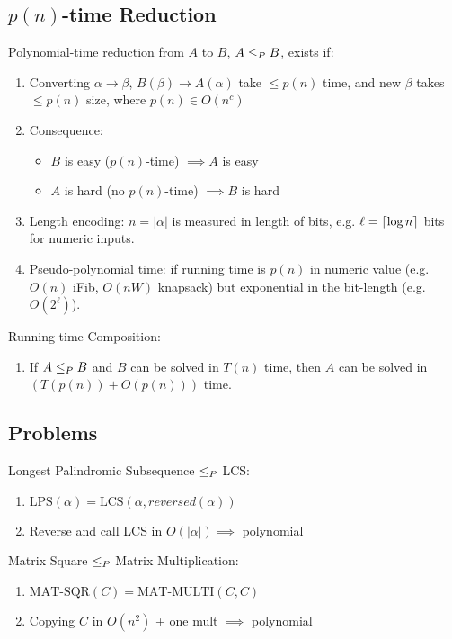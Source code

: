 \documentclass[12pt, a4paper]{article}
\begin{document}
\begin{multicols*}{3}
\subsection{$p(n)$-time Reduction}
Polynomial-time reduction from $A$ to $B$, $A \leq_{P} B$, exists if:
\begin{enumerate}[\roman*.]
  \item Converting $\alpha \rightarrow \beta$, $B(\beta) \rightarrow A(\alpha)$ take $\leq p(n)$ time, and new $\beta$ takes $\leq p(n)$ size, where $p(n) \in O(n^c)$
  \item Consequence:
    \begin{itemize}\vspace{2pt}
      \item $B$ is easy ($p(n)$-time) $\implies A$ is easy
      \item $A$ is hard (no $p(n)$-time) $\implies B$ is hard
    \end{itemize}
  \item Length encoding: $n=|\alpha|$ is measured in length of bits, e.g. $\ell = \lceil \log n \rceil$ bits for numeric inputs.  
  \item Pseudo-polynomial time: if running time is $p(n)$ in numeric value (e.g. $O(n)$ iFib, $O(nW)$ knapsack) but exponential in the bit-length (e.g. $O(2^\ell)$).  
\end{enumerate}

Running-time Composition:
\begin{enumerate}[\roman*.]
  \item If $A \leq_{P} B$ and $B$ can be solved in $T(n)$ time, then  
        $A$ can be solved in $\left(T(p(n)) + O(p(n))\right)$ time.
\end{enumerate}

\subsection*{Problems}
Longest Palindromic Subsequence $\leq_{P}$ LCS:
\begin{enumerate}[\roman*.]
  \item $\text{LPS}(\alpha) = \text{LCS}(\alpha, reversed(\alpha))$
  \item Reverse and call LCS in $O(|\alpha|) \implies $ polynomial
\end{enumerate}

Matrix Square $\leq_{P}$ Matrix Multiplication:
\begin{enumerate}[\roman*.]
  \item $\text{MAT-SQR}(C) =\text{MAT-MULTI}(C, C)$
  \item Copying $C$ in $O(n^{2})$ + one mult $\implies$ polynomial
\end{enumerate}


\end{multicols*}
\end{document}
